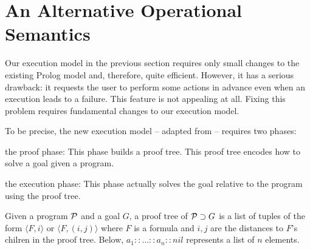 \documentclass[12pt]{article}
\newenvironment{numberedlist}
{\begin{list}{\makebox[20pt]{\hss(\arabic{itemno})\enspace}}
             {\usecounter{itemno}\labelwidth 20pt}}{\end{list}}
\newcounter{itemno}
\newcounter{itemno1}
\newcounter{itemno2}
\newcommand{\Pscr}{{\cal P}}
\newcommand{\lb}{\langle}
\newcommand{\rb}{\rangle}
\begin{document}
\section{An Alternative Operational Semantics}\label{sec:0627}

Our execution model in the previous section  requires only small changes to the existing Prolog model and,
therefore, quite efficient. However, it has a serious drawback: it requests the user to perform some actions in advance
even when an execution leads to a failure. This feature is not appealing at all.
Fixing this problem requires fundamental changes to our execution model.

To be precise, the new execution model -- adapted from \cite{Jap03} -- requires two phases:

\begin{numberedlist}

\item the proof phase: This phase builds a proof tree. This proof tree 
 encodes how to solve a goal given a program.

\item the execution phase: This phase actually solves the goal relative to the program using the proof tree.

\end{numberedlist}

\noindent 


Given a program $\Pscr$ and a goal $G$, a proof tree of $\Pscr \supset G$ is a list of tuples of
the form $\lb F,i \rb$ or $\lb F,(i,j) \rb$ where $F$ is a formula and $i,j$ are the distances to $F$'s chilren
in the proof tree. Below, $a_1::\ldots::a_n::nil$ represents a list of $n$ elements.
\end{document}
